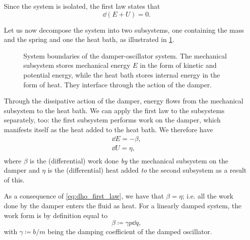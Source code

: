 Since the system is isolated, the first law states that 
\begin{equation}
    \dd{(E + U)} = 0. 
    \label{eq:dho_first_law}
\end{equation}

Let us now decompose the system into two subsystems, one containing the mass and the spring and one the heat bath, as illustrated in \cref{fig:oscillator_thermo}. 
\begin{figure}[ht!]
    \centering
    
    \caption{System boundaries of the damper-oscillator system. The mechanical subsystem stores mechanical energy \(E\) in the form of kinetic and potential energy, while the heat bath stores internal energy in the form of heat. They interface through the action of the damper.}
    \label{fig:oscillator_thermo}
\end{figure}

Through the dissipative action of the damper, energy flows from the mechanical subsystem to the heat bath. We can apply the first law to the subsystems separately, too: the first subsystem performs work on the damper, which manifests itself as the heat added to the heat bath. We therefore have
\begin{equation}
    \begin{split}
        \dd{E}  = -\beta, \\[0.2cm]
        \dd{U} = \eta, \\
    \end{split}
    \label{eq:dho_energy_balance}
\end{equation}
where \(\beta\) is the (differential) work done \emph{by} the mechanical subsystem on the damper and \(\eta\) is the (differential) heat added \emph{to} the second subsystem as a result of this. 

As a consequence of \cref{eq:dho_first_law}, we have that \( \beta = \eta \); i.e. all the work done by the damper enters the fluid as heat. For a linearly damped system, the work form is by definition equal to 
\begin{equation}
    \beta \coloneq \gamma p \dd{q},
    \label{eq:dho_work_form}
\end{equation}
with \(\gamma \coloneq b/m\) being the damping coefficient of the damped oscillator. 

